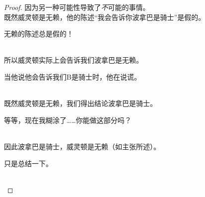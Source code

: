 \begin{enumerate}
\begin{enumerate}
{\begin{proof}
{      因为另一种可能性导致了{\em 不}可能的事情。
      }\\
      既然威灵顿是无赖，他的陈述“我会告诉你波拿巴是骑士”是假的。\\
      \rule{0pt}{0pt} \hfill \parbox{3in}{\color[rgb]{1,0,0} 
      无赖的陈述总是假的！
      }\\
      所以威灵顿实际上会告诉我们波拿巴是无赖。\\
      \rule{0pt}{0pt} \hfill \parbox{3in}{\color[rgb]{1,0,0} 
      当他说他会告诉我们B是骑士时，他在说谎。
      } \\
      既然威灵顿是无赖，我们得出结论波拿巴是骑士。\\
      \rule{0pt}{0pt} \hfill \parbox{3in}{\color[rgb]{1,0,0} 
      等等，现在我糊涂了……你能做这部分吗？
      } \\
      因此波拿巴是骑士，威灵顿是无赖（如主张所述）。\\
      \rule{0pt}{0pt} \hfill \parbox{3in}{\color[rgb]{1,0,0} 
      只是总结一下。
      } \\
  \end{proof}
  
  }
  
  \end{enumerate}
  
  \end{enumerate}